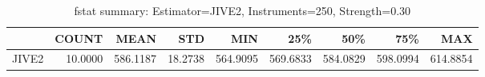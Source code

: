 \begin{table}[ht]
\centering
\caption{fstat summary: Estimator=JIVE2, Instruments=250, Strength=0.30}
\begin{tabular}{lrrrrrrrr}
\toprule
 & COUNT & MEAN & STD & MIN & 25\% & 50\% & 75\% & MAX \\
\midrule
JIVE2 & 10.0000 & 586.1187 & 18.2738 & 564.9095 & 569.6833 & 584.0829 & 598.0994 & 614.8854 \\
\bottomrule
\end{tabular}
\end{table}
